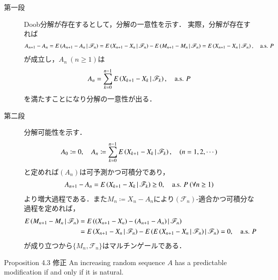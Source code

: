 	\begin{prf}\mbox{}
		\begin{description}
			\item[第一段]
				Doob分解が存在するとして，分解の一意性を示す．
				実際，分解が存在すれば
				\begin{align}
					A_{n+1} - A_n = E\left( A_{n+1}-A_n \, \middle|\, \mathscr{F}_{n} \right)
					= E\left( X_{n+1}-X_n \, \middle|\, \mathscr{F}_{n} \right) - E\left( M_{n+1}-M_n \, \middle|\, \mathscr{F}_{n} \right)
					= E\left( X_{n+1}-X_n \, \middle|\, \mathscr{F}_{n} \right),
					\quad \mbox{a.s. $P$}
				\end{align}
				が成立し，$A_n\ (n \geq 1)$は
				\begin{align}
					A_n = \sum_{k=0}^{n-1} E\left( X_{k+1}-X_k \, \middle|\, \mathscr{F}_{k} \right),
					\quad \mbox{a.s. $P$}
				\end{align}
				を満たすことになり分解の一意性が出る．
				
			\item[第二段]
				分解可能性を示す．
				\begin{align}
					A_0 \coloneqq 0,
					\quad A_n \coloneqq \sum_{k=0}^{n-1} E\left( X_{k+1}-X_k \, \middle|\, \mathscr{F}_{k} \right),
					\quad (n=1,2,\cdots)
				\end{align}
				と定めれば$(A_n)$は可予測かつ可積分であり，
				\begin{align}
					A_{n+1} - A_n = E\left( X_{k+1}-X_k \, \middle|\, \mathscr{F}_{k} \right) \geq 0,
					\quad \mbox{a.s. $P$}
					\ (\forall n \geq 1)
				\end{align}
				より増大過程である．また$M_n \coloneqq X_n - A_n$により$(\mathscr{F}_n)$-適合かつ可積分な過程を定めれば，
				\begin{align}
					E\left( M_{n+1} - M_n \, \middle|\, \mathscr{F}_n \right)
					&= E\left( (X_{n+1} - X_n)-(A_{n+1}-A_n) \, \middle|\, \mathscr{F}_n \right) \\
					&= E\left( X_{n+1} - X_n \, \middle|\, \mathscr{F}_n \right) - E\left( E\left( X_{n+1} - X_n \, \middle|\, \mathscr{F}_n \right) \, \middle|\, \mathscr{F}_n \right)
					= 0,
					\quad \mbox{a.s. $P$}
				\end{align}
				が成り立つから$\{M_n,\mathscr{F}_n\}$はマルチンゲールである．
				\QED
		\end{description}
	\end{prf}
	
	\begin{itembox}[l]{Proposition 4.3 修正}
		An increasing random sequence $A$ has a predictable modification
		if and only if it is natural.
	\end{itembox}
	
